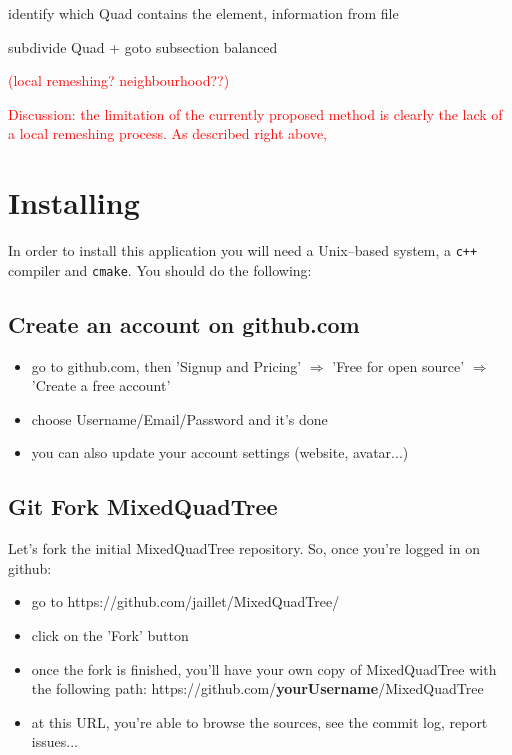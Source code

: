 \documentclass[10pt]{article}
\begin{document}
identify which Quad contains the element, information from file

subdivide Quad + goto subsection balanced

\textcolor{red}{
(local remeshing? neighbourhood??)
}

\textcolor{red}{
Discussion: the limitation of the currently proposed method is clearly the lack of a local remeshing process. As described right above, 
}


\section{Installing}
\label{install}

In order to install this application you will need a Unix--based system, a \texttt{c++} compiler and \texttt{cmake}. You should do the following:

\subsection{Create an account on github.com}

\begin{itemize}
\item go to github.com, then 'Signup and Pricing' $\Rightarrow$ 'Free for open source' $\Rightarrow$ 'Create a free account'
\item choose Username/Email/Password and it's done
\item you can also update your account settings (website, avatar...)
\end {itemize}

\subsection{Git Fork MixedQuadTree}

Let's fork the initial MixedQuadTree repository. So, once you're logged in on github:
\begin{itemize}
\item go to https://github.com/jaillet/MixedQuadTree/
\item click on the 'Fork' button
\item once the fork is finished, you'll have your own copy of MixedQuadTree with the following path: https://github.com/\textbf{yourUsername}/MixedQuadTree
\item at this URL, you're able to browse the sources, see the commit log, report issues...
\end {itemize}
\end{document}
